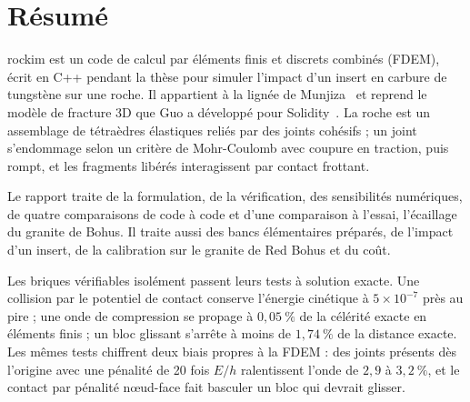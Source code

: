 \section*{Résumé}

rockim est un code de calcul par éléments finis et discrets combinés (FDEM), écrit en C++ pendant la thèse pour simuler l'impact d'un insert en carbure de tungstène sur une roche. Il appartient à la lignée de Munjiza~\cite{munjiza2004fdem} et reprend le modèle de fracture 3D que Guo a développé pour Solidity~\cite{guo2014thesis}. La roche est un assemblage de tétraèdres élastiques reliés par des joints cohésifs ; un joint s'endommage selon un critère de Mohr-Coulomb avec coupure en traction, puis rompt, et les fragments libérés interagissent par contact frottant.

Le rapport traite de la formulation, de la vérification, des sensibilités numériques, de quatre comparaisons de code à code et d'une comparaison à l'essai, l'écaillage du granite de Bohus. Il traite aussi des bancs élémentaires préparés, de l'impact d'un insert, de la calibration sur le granite de Red Bohus et du coût.

Les briques vérifiables isolément passent leurs tests à solution exacte. Une collision par le potentiel de contact conserve l'énergie cinétique à $5\times10^{-7}$ près au pire ; une onde de compression se propage à $0{,}05~\%$ de la célérité exacte en éléments finis ; un bloc glissant s'arrête à moins de $1{,}74~\%$ de la distance exacte. Les mêmes tests chiffrent deux biais propres à la FDEM : des joints présents dès l'origine avec une pénalité de 20 fois $E/h$ ralentissent l'onde de $2{,}9$ à $3{,}2~\%$, et le contact par pénalité nœud-face fait basculer un bloc qui devrait glisser.

